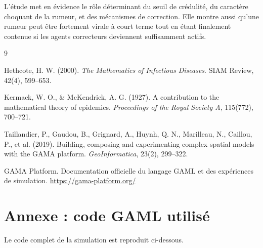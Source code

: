 \documentclass[11pt,a4paper]{article}
\begin{document}
L'étude met en évidence le rôle déterminant du seuil de crédulité, du caractère choquant de la rumeur, et des mécanismes de correction. Elle montre aussi qu'une rumeur peut être fortement virale à court terme tout en étant finalement contenue si les agents correcteurs deviennent suffisamment actifs.

\newpage
\begin{thebibliography}{9}

Hethcote, H. W. (2000).
\emph{The Mathematics of Infectious Diseases}.
SIAM Review, 42(4), 599--653.

Kermack, W. O., \& McKendrick, A. G. (1927).
A contribution to the mathematical theory of epidemics.
\emph{Proceedings of the Royal Society A}, 115(772), 700--721.

Taillandier, P., Gaudou, B., Grignard, A., Huynh, Q. N., Marilleau, N., Caillou, P., et al. (2019).
Building, composing and experimenting complex spatial models with the GAMA platform.
\emph{GeoInformatica}, 23(2), 299--322.

GAMA Platform. Documentation officielle du langage GAML et des expériences de simulation.
\url{https://gama-platform.org/}

\end{thebibliography}

\appendix
\section{Annexe : code GAML utilisé}

Le code complet de la simulation est reproduit ci-dessous.
\end{document}
